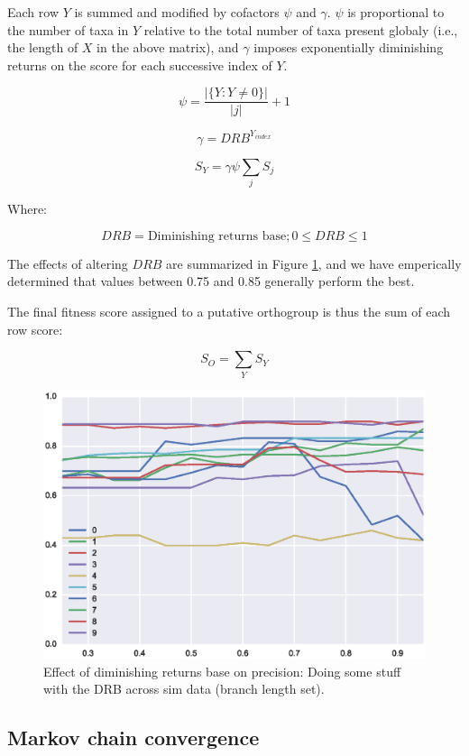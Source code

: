 \documentclass[twocolumn]{bmcart}%
\begin{document}
Each row $Y$ is summed and modified by cofactors $\psi$ and $\gamma$. $\psi$ is proportional to the number of taxa in $Y$ relative to the total number of taxa present globaly (i.e., the length of $X$ in the above matrix), and $\gamma$ imposes exponentially diminishing returns on the score for each successive index of $Y$.

$$
\psi = \frac{|\{Y:Y \neq 0\}|}{|j|} + 1
$$

$$
\gamma = DRB^{Y_{index}}
$$

$$
S_Y = \gamma\psi\sum_{j} S_j
$$

Where:

$$
DRB = \text{Diminishing returns base}; 0 \leq DRB \leq 1
$$

The effects of altering $DRB$ are summarized in Figure \ref{fig:dim_rets}, and we have emperically determined that values between 0.75 and 0.85 generally perform the best.

The final fitness score assigned to a putative orthogroup is thus the sum of each row score:

$$
S_O = \sum_{Y} S_Y
$$

\begin{figure}[t]
  \begin{center}
  \includegraphics[height=0.22\textheight]{../figures/dim_ret_precision_line.eps}
\end{center}
\caption{Effect of diminishing returns base on precision: Doing some stuff with the DRB across sim data (branch length set).}
\label{fig:dim_rets}
\end{figure}


\subsection{Markov chain convergence}
\lipsum[3]
\end{document}
